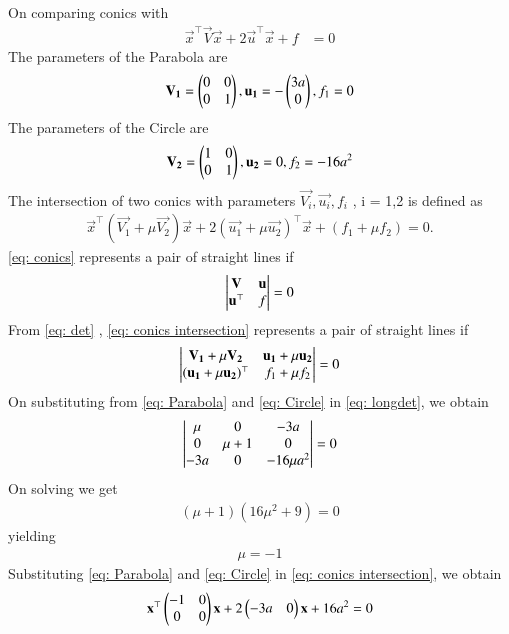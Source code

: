 \documentclass[journal]{IEEEtran}
\begin{document}
On comparing conics with 
\begin{align}
\vec{x}^\top\vec{V}\vec{x} + 2\vec{u}^\top\vec{x} + f &= 0 \label{eq: conics}
\end{align}
The parameters of the Parabola are 
\begin{align}
\mathbf{V_1}=\begin{pmatrix}0&0\\0&1\end{pmatrix} , \mathbf{u_1}=-\begin{pmatrix}3a\\0\end{pmatrix} , f_1=0 \label{eq: Parabola}
\end{align}
The parameters of the Circle are
\begin{align}
\mathbf{V_2}=\begin{pmatrix}1&0\\0&1\end{pmatrix},\mathbf{u_2}=0,f_2=-16a^2  \label{eq: Circle}
\end{align}
The intersection of two conics with parameters $\vec{V_i},\vec{u_i},f_i$ , i = 1,2 is defined as
\begin{align}
\vec{x}^\top(\vec{V_1} + \mu\vec{V_2})\vec{x} + 2(\vec{u_1} + \mu\vec{u_2})^\top\vec{x} + (f_1 +\mu f_2) = 0. \label{eq: conics intersection}
\end{align}
\eqref{eq: conics} represents a pair of straight lines if 
\begin{align}
\begin{vmatrix}\mathbf{V}&\mathbf{u}\\\mathbf{u}^\top&f\end{vmatrix} = 0  \label{eq: det}
\end{align}
From \eqref{eq: det} , \eqref{eq: conics intersection} represents a pair of straight lines if
\begin{align}
\begin{vmatrix}\mathbf{V_1} + \mu\mathbf{V_2}&\mathbf{u_1} + \mu\mathbf{u_2}\\
       (\mathbf{u_1} + \mu\mathbf{u_2})^\top&f_1 + \mu f_2\end{vmatrix} = 0  \label{eq: longdet}
\end{align}
On substituting from \eqref{eq: Parabola} and \eqref{eq: Circle} in \eqref{eq: longdet}, we obtain
\begin{align}
\begin{vmatrix}\mu&0&-3a\\
       0&\mu+1&0\\
       -3a&0&-16\mu a^2\end{vmatrix} = 0
\end{align}
On solving we get
\begin{align}
(\mu + 1)(16 \mu^2 + 9) = 0
\end{align}
yielding
\begin{align}
\mu = -1
\end{align}
Substituting \eqref{eq: Parabola} and \eqref{eq: Circle} in \eqref{eq: conics intersection}, we obtain
\begin{align}
\mathbf{x}^\top\begin{pmatrix}-1&0\\0&0\end{pmatrix}\mathbf{x} + 2\begin{pmatrix}-3a&0\end{pmatrix}\mathbf{x} + 16a^2 = 0
\end{align}
\end{document}
